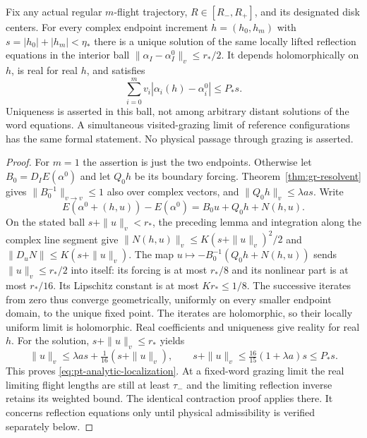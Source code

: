 \begin{theorem}
\label{thm:pt-analytic}
Fix any actual regular $m$-flight trajectory, $R\in[R_-,R_+]$,
and its designated disk centers.  For every complex endpoint increment
$h=(h_0,h_m)$ with $s=|h_0|+|h_m|<\eta_*$ there is a unique
solution of the same locally lifted reflection equations in the
interior ball $\|\alpha_I-\alpha_I^0\|_v\le r_*/2$.
It depends holomorphically on $h$, is real for real $h$, and satisfies
\begin{equation}\label{eq:pt-analytic-localization}
 \sum_{i=0}^m v_i|\alpha_i(h)-\alpha_i^0|\le P_*s.
\end{equation}
Uniqueness is asserted in this ball, not among arbitrary distant
solutions of the word equations.  A simultaneous visited-grazing
limit of reference configurations has the same formal statement.
No physical passage through grazing is asserted.
\end{theorem}
\begin{proof}
For $m=1$ the assertion is just the two endpoints.  Otherwise let
$B_0=D_IE(\alpha^0)$ and let $Q_0h$ be its boundary forcing.
Theorem~\ref{thm:gr-resolvent} gives
$\|B_0^{-1}\|_{v\to v}\le1$ also over complex vectors, and
$\|Q_0h\|_v\le\lambda a s$.  Write
\[
 E(\alpha^0+(h,u))-E(\alpha^0)=B_0u+Q_0h+N(h,u).
\]
On the stated ball $s+\|u\|_v<r_*$, the preceding lemma and
integration along the complex line segment give
$\|N(h,u)\|_v\le K(s+\|u\|_v)^2/2$ and
$\|D_uN\|\le K(s+\|u\|_v)$.
The map $u\mapsto-B_0^{-1}(Q_0h+N(h,u))$ sends
$\|u\|_v\le r_*/2$ into itself: its forcing is at most $r_*/8$
and its nonlinear part is at most $r_*/16$.  Its Lipschitz constant
is at most $Kr_*\le1/8$.  The successive iterates from zero thus
converge geometrically, uniformly on every smaller endpoint domain,
to the unique fixed point.  The iterates are holomorphic, so their
locally uniform limit is holomorphic.  Real coefficients and uniqueness
give reality for real $h$.
For the solution, $s+\|u\|_v\le r_*$ yields
\[
 \|u\|_v\le\lambda a s+\tfrac1{16}(s+\|u\|_v),
 \qquad
 s+\|u\|_v\le\tfrac{16}{15}(1+\lambda a)s\le P_*s.
\]
This proves \eqref{eq:pt-analytic-localization}.
At a fixed-word grazing limit the real limiting flight lengths are
still at least $\tau_-$ and the limiting reflection inverse retains
its weighted bound.  The identical contraction proof applies there.
It concerns reflection equations only until physical admissibility
is verified separately below.
\end{proof}

